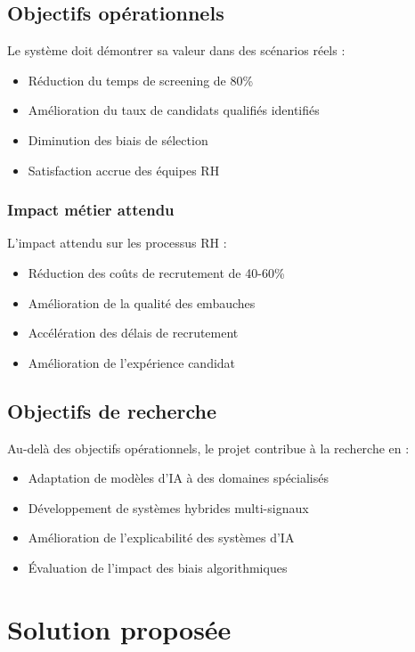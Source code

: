 \documentclass[12pt,a4paper]{report}
\begin{document}
\subsection{Objectifs opérationnels}

Le système doit démontrer sa valeur dans des scénarios réels :
\begin{itemize}
\item Réduction du temps de screening de 80\%
\item Amélioration du taux de candidats qualifiés identifiés
\item Diminution des biais de sélection
\item Satisfaction accrue des équipes RH
\end{itemize}

\subsubsection{Impact métier attendu}

L'impact attendu sur les processus RH :
\begin{itemize}
\item Réduction des coûts de recrutement de 40-60\%
\item Amélioration de la qualité des embauches
\item Accélération des délais de recrutement
\item Amélioration de l'expérience candidat
\end{itemize}

\subsection{Objectifs de recherche}

Au-delà des objectifs opérationnels, le projet contribue à la recherche en :
\begin{itemize}
\item Adaptation de modèles d'IA à des domaines spécialisés
\item Développement de systèmes hybrides multi-signaux
\item Amélioration de l'explicabilité des systèmes d'IA
\item Évaluation de l'impact des biais algorithmiques
\end{itemize}

\section{Solution proposée}
\end{document}
